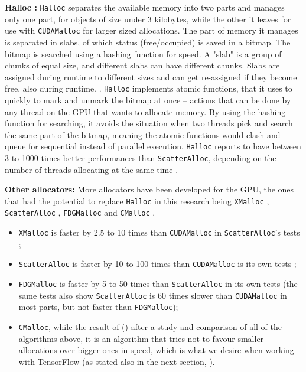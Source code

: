 \documentclass[12pt,twoside]{article}
\begin{document}
\textbf{Halloc \cite{halloc-paper}:} \texttt{Halloc} separates the available memory into two parts and manages only one part, for objects of size under 3 kilobytes, while the other it leaves for use with \texttt{CUDAMalloc} for larger sized allocations. The part of memory it manages is separated in slabs, of which status (free/occupied) is saved in a bitmap. The bitmap is searched using a hashing function for speed. A "slab" is a group of chunks of equal size, and different slabs can have different chunks. Slabs are assigned during runtime to different sizes and can get re-assigned if they become free, also during runtime. \cite{Vinkler2015}. \texttt{Halloc} implements atomic functions, that it uses to quickly to mark and unmark the bitmap at once -- actions that can be done by any thread on the GPU that wants to allocate memory. By using the hashing function for searching, it avoids the situation when two threads pick and search the same part of the bitmap, meaning the atomic functions would clash \cite{Vinkler2015} and queue for sequential instead of parallel execution. \texttt{Halloc} reports to have between 3 to 1000 times better performances than \texttt{ScatterAlloc}, depending on the number of threads allocating at the same time \cite{halloc-paper}.

\textbf{Other allocators:} More allocators have been developed for the GPU, the ones that had the potential to replace \texttt{Halloc} in this research being \texttt{XMalloc} \cite{xmalloc}, \texttt{ScatterAlloc} \cite{scatter-alloc}, \texttt{FDGMalloc} \cite{fdgmalloc} and \texttt{CMalloc} \cite{Vinkler2015}.

\begin{itemize}

\item \texttt{XMalloc} is faster by 2.5 to 10 times than \texttt{CUDAMalloc} in \texttt{ScatterAlloc}'s tests \cite{scatter-alloc};

\item \texttt{ScatterAlloc} is faster by 10 to 100 times than \texttt{CUDAMalloc} is its own tests \cite{scatter-alloc};

\item \texttt{FDGMalloc} is faster by 5 to 50 times than \texttt{ScatterAlloc} in its own tests \cite{fdgmalloc} (the same tests also show \texttt{ScatterAlloc} is 60 times slower than \texttt{CUDAMalloc} in most parts, but not faster than \texttt{FDGMalloc});

\item \texttt{CMalloc}, while the result of \citeauthor{Vinkler2015} (\citeyear{Vinkler2015}) \cite{Vinkler2015} after a study and comparison of all of the algorithms above, it is an algorithm that tries not to favour smaller allocations over bigger ones in speed, which is what we desire when working with TensorFlow (as stated also in the next section, \textit{}).

\end{itemize}
\end{document}
